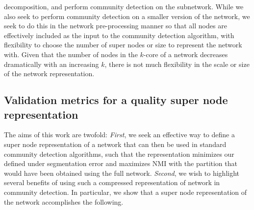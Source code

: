 decomposition, and perform community detection on the subnetwork. While we also seek to perform community detection on a smaller version of the network, we seek to do this in the network pre-processing manner so that all nodes are effectively included as the input to the community detection algorithm, with flexibility to choose the number of super nodes or size to represent the network with. Given that the number of nodes in the $k$-core of a network decreases dramatically with an increasing $k$, there is not much flexibility in the scale or size of the network representation.

\subsection{Validation metrics for a quality super node representation}
The aims of this work are twofold: \emph{First}, we seek an effective way to define a super node representation of a network that can then be used in standard community detection algorithms, such that the representation minimizes our defined under segmentation error and maximizes NMI with the partition that would have been obtained using the full network. \emph{Second}, we wish to highlight several benefits of using such a compressed representation of network in community detection. In particular, we show that a super node representation of the network accomplishes the following.%

